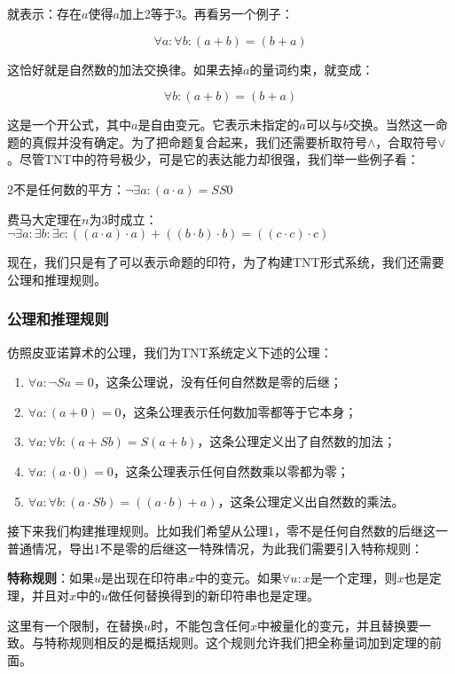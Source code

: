 \documentclass{article}
\begin{document}
就表示：存在$a$使得$a$加上2等于3。再看另一个例子：

\[
\forall a : \forall b : (a + b) = (b + a)
\]

这恰好就是自然数的加法交换律。如果去掉$a$的量词约束，就变成：

\[
\forall b : (a + b) = (b + a)
\]

这是一个开公式，其中$a$是自由变元。它表示未指定的$a$可以与$b$交换。当然这一命题的真假并没有确定。为了把命题复合起来，我们还需要析取符号$\land$，合取符号$\lor$。尽管TNT中的符号极少，可是它的表达能力却很强，我们举一些例子看：

2不是任何数的平方：$\lnot \exists a : (a \cdot a) = SS0$

费马大定理在$n$为3时成立：$\lnot \exists a : \exists b : \exists c : ((a \cdot a) \cdot a) + ((b \cdot b) \cdot b) = ((c \cdot c) \cdot c)$

现在，我们只是有了可以表示命题的印符，为了构建TNT形式系统，我们还需要公理和推理规则。

\subsubsection{公理和推理规则}

仿照皮亚诺算术的公理，我们为TNT系统定义下述的公理：

\begin{enumerate}
\item $\forall a : \lnot Sa = 0$，这条公理说，没有任何自然数是零的后继；
\item $\forall a: (a + 0) = 0$，这条公理表示任何数加零都等于它本身；
\item $\forall a: \forall b: (a + Sb) = S(a + b)$，这条公理定义出了自然数的加法；
\item $\forall a: (a \cdot 0) = 0$，这条公理表示任何自然数乘以零都为零；
\item $\forall a: \forall b: (a \cdot Sb) = ((a \cdot b) + a)$，这条公理定义出自然数的乘法。
\end{enumerate}

接下来我们构建推理规则。比如我们希望从公理1，零不是任何自然数的后继这一普通情况，导出1不是零的后继这一特殊情况，为此我们需要引入特称规则：

\textbf{特称规则}：如果$u$是出现在印符串$x$中的变元。如果$\forall u: x$是一个定理，则$x$也是定理，并且对$x$中的$u$做任何替换得到的新印符串也是定理。

这里有一个限制，在替换$u$时，不能包含任何$x$中被量化的变元，并且替换要一致。与特称规则相反的是概括规则。这个规则允许我们把全称量词加到定理的前面。
\end{document}
